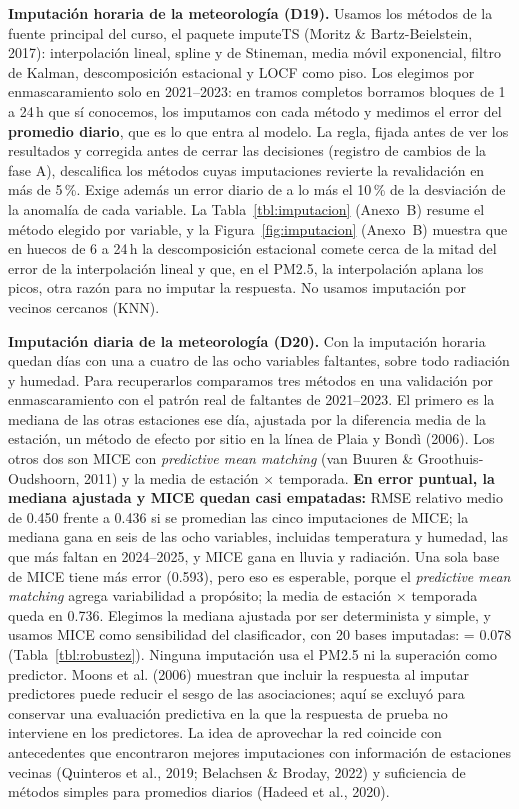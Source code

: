 \textbf{Imputación horaria de la meteorología (D19).} Usamos los métodos de la fuente principal del curso, el paquete imputeTS (Moritz \& Bartz-Beielstein, 2017): interpolación lineal, spline y de Stineman, media móvil exponencial, filtro de Kalman, descomposición estacional y LOCF como piso. Los elegimos por enmascaramiento solo en 2021–2023: en tramos completos borramos bloques de 1 a 24\,h que sí conocemos, los imputamos con cada método y medimos el error del \textbf{promedio diario}, que es lo que entra al modelo. La regla, fijada antes de ver los resultados y corregida antes de cerrar las decisiones (registro de cambios de la fase A), descalifica los métodos cuyas imputaciones revierte la revalidación en más de 5\,\%. Exige además un error diario de a lo más el 10\,\% de la desviación de la anomalía de cada variable. La Tabla~\ref{tbl:imputacion} (Anexo~B) resume el método elegido por variable, y la Figura~\ref{fig:imputacion} (Anexo~B) muestra que en huecos de 6 a 24\,h la descomposición estacional comete cerca de la mitad del error de la interpolación lineal y que, en el PM2.5, la interpolación aplana los picos, otra razón para no imputar la respuesta. No usamos imputación por vecinos cercanos (KNN).

\textbf{Imputación diaria de la meteorología (D20).} Con la imputación horaria quedan días con una a cuatro de las ocho variables faltantes, sobre todo radiación y humedad. Para recuperarlos comparamos tres métodos en una validación por enmascaramiento con el patrón real de faltantes de 2021–2023. El primero es la mediana de las otras estaciones ese día, ajustada por la diferencia media de la estación, un método de efecto por sitio en la línea de Plaia y Bondì (2006). Los otros dos son MICE con \emph{predictive mean matching} (van Buuren \& Groothuis-Oudshoorn, 2011) y la media de estación × temporada. \textbf{En error puntual, la mediana ajustada y MICE quedan casi empatadas:} RMSE relativo medio de 0.450 frente a 0.436 si se promedian las cinco imputaciones de MICE; la mediana gana en seis de las ocho variables, incluidas temperatura y humedad, las que más faltan en 2024–2025, y MICE gana en lluvia y radiación. Una sola base de MICE tiene más error (0.593), pero eso es esperable, porque el \emph{predictive mean matching} agrega variabilidad a propósito; la media de estación × temporada queda en 0.736. Elegimos la mediana ajustada por ser determinista y simple, y usamos MICE como sensibilidad del clasificador, con 20 bases imputadas: \dauc{} = 0.078 (Tabla~\ref{tbl:robustez}). Ninguna imputación usa el PM2.5 ni la superación como predictor. Moons et al. (2006) muestran que incluir la respuesta al imputar predictores puede reducir el sesgo de las asociaciones; aquí se excluyó para conservar una evaluación predictiva en la que la respuesta de prueba no interviene en los predictores. La idea de aprovechar la red coincide con antecedentes que encontraron mejores imputaciones con información de estaciones vecinas (Quinteros et al., 2019; Belachsen \& Broday, 2022) y suficiencia de métodos simples para promedios diarios (Hadeed et al., 2020).

